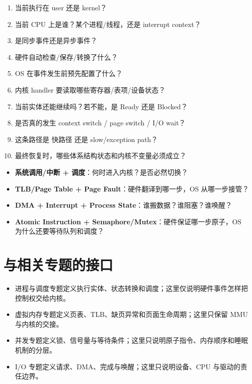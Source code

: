 \documentclass[11pt,a4paper]{ctexart}
\newcommand{\kw}[1]{\textbf{#1}}
\begin{document}
\begin{method}[软硬件分工十问]
\begin{enumerate}
  \item 当前执行在 user 还是 kernel？
  \item 当前 CPU 上是谁？某个进程/线程，还是 interrupt context？
  \item 是同步事件还是异步事件？
  \item 硬件自动检查/保存/转换了什么？
  \item OS 在事件发生前预先配置了什么？
  \item 内核 handler 要读取哪些寄存器/表项/设备状态？
  \item 当前实体还能继续吗？若不能，是 Ready 还是 Blocked？
  \item 是否真的发生 context switch / page switch / I/O wait？
  \item 这条路径是 快路径 还是 slow/exception path？
  \item 最终恢复时，哪些体系结构状态和内核不变量必须成立？
\end{enumerate}
\end{method}

\begin{exam}[四类最常见综合题]
\begin{itemize}
  \item \kw{系统调用/中断 + 调度}：何时进入内核？是否必然切换？
  \item \kw{TLB/Page Table + Page Fault}：硬件翻译到哪一步，OS 从哪一步接管？
  \item \kw{DMA + Interrupt + Process State}：谁搬数据？谁阻塞？谁唤醒？
  \item \kw{Atomic Instruction + Semaphore/Mutex}：硬件保证哪一步原子，OS 为什么还要等待队列和调度？
\end{itemize}
\end{exam}

\section{与相关专题的接口}
\begin{bridge}[责任边界]
\begin{itemize}
  \item 进程与调度专题定义执行实体、状态转换和调度；这里仅说明硬件事件怎样把控制权交给内核。
  \item 虚拟内存专题定义页表、TLB、缺页异常和页面生命周期；这里只保留 MMU 与内核的交接。
  \item 并发专题定义锁、信号量与等待条件；这里只说明原子指令、内存顺序和睡眠机制的分层。
  \item I/O 专题定义请求、DMA、完成与唤醒；这里只说明设备、CPU 与驱动的责任边界。
\end{itemize}
\end{bridge}
\end{document}
